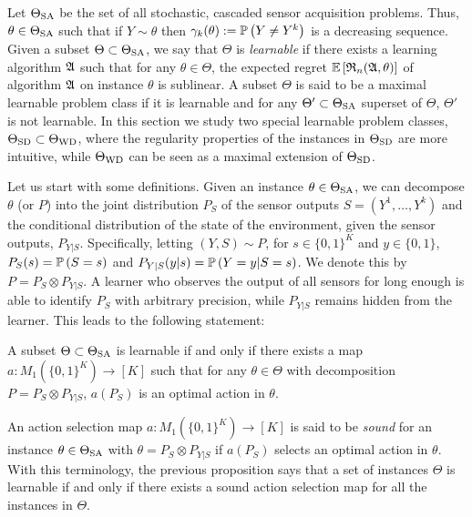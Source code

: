 Let $\Theta_{\mathrm{SA}}$ be the set of all stochastic, cascaded sensor acquisition problems. 
Thus, $\theta \in \Theta_{\mathrm{SA}}$ such that if $Y\sim \theta$ then $\gamma_k(\theta):=\mathbb{P}\left(Y\ne Y^k\right)$ 
is a decreasing sequence.
Given a subset $\Theta\subset \Theta_{\mathrm{SA}}$, we say that $\Theta$ is \emph{learnable} 
if there exists a learning algorithm $\mathfrak{A}$ such that
for any $\theta\in \Theta$, the expected regret $\mathbb{E}\left[ \mathfrak{R}_n(\mathfrak{A},\theta) \right]$ 
of algorithm $\mathfrak{A}$ on instance $\theta$ is sublinear.
A subset $\Theta$ is said to be a maximal learnable problem class if it is learnable and for any $\Theta'\subset \Theta_{\mathrm{SA}}$ superset
of $\Theta$, $\Theta'$ is not learnable.
In this section we study two special learnable problem classes, $\Theta_{\mathrm{SD}}\subset \Theta_{\mathrm{WD}}$, where the regularity properties of the instances in $\Theta_{\mathrm{SD}}$ are more intuitive, while $\Theta_{\mathrm{WD}}$ can be seen as a maximal extension of $\Theta_{\mathrm{SD}}$.

Let us start with some definitions.
Given an instance $\theta \in \Theta_{\mathrm{SA}}$, we can decompose $\theta$ (or $P$) into the joint distribution $P_S$ of the sensor outputs $S = (Y^1,\dots,Y^k)$ and the conditional distribution of the state of the environment, given the sensor outputs, $P_{Y|S}$.
Specifically, letting $(Y,S)\sim P$, for $s\in \{0,1\}^K$ and $y\in \{0,1\}$, $P_S(s) = \mathbb{P}\left(S = s\right)$ and $P_{Y|S}(y|s) = \mathbb{P}\left(Y=y|S=s\right)$. We denote this by $P = P_S \otimes P_{Y|S}$.
A learner who observes the output of all sensors for long enough is able to identify 
$P_S$ with arbitrary precision, while $P_{Y|S}$ remains hidden from the learner.
 This leads to the following statement:
\begin{prop}
\label{prop:learnablemap}
A subset $\Theta\subset \Theta_{\mathrm{SA}}$ is learnable 
if and only if there exists a map $a: M_1( \{0,1\}^K )\to [K]$ such that 
for any $\theta \in \Theta$ 
with decomposition $P = P_S \otimes P_{Y|S}$, $a(P_S)$ is an optimal action in $\theta$.
\end{prop}


An action selection map  $a: M_1( \{0,1\}^K ) \to [K]$ is said to be \emph{sound} for an instance 
$\theta\in \Theta_{\mathrm{SA}}$ with $\theta = P_S\otimes P_{Y|S}$ if $a(P_S)$ selects an optimal action in $\theta$.
With this terminology, the previous proposition says that a set of instances $\Theta$ is learnable if and only if there exists a
sound action selection map for all the instances in $\Theta$.

